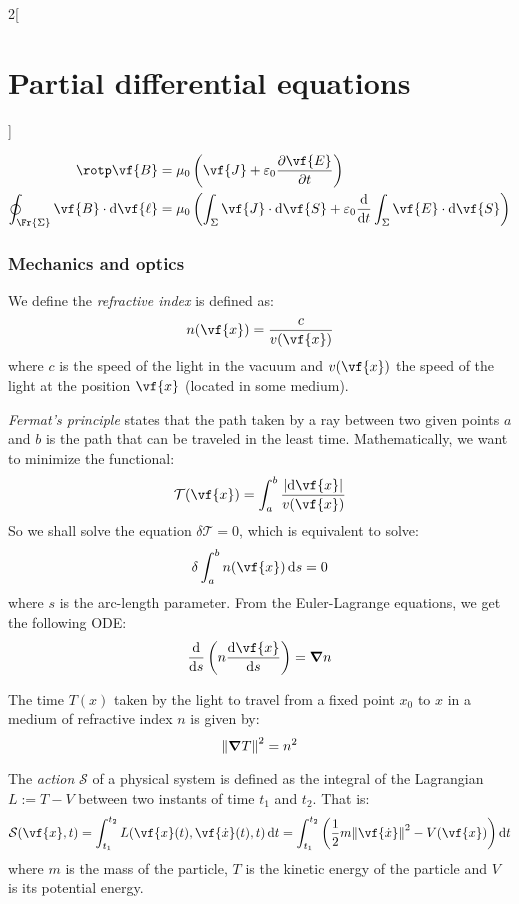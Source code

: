\documentclass[../../../main_math.tex]{subfiles}
\begin{document}
\begin{multicols}{2}[\section{Partial differential equations}]
\begin{proposition}
    \begin{align*}
      \rotp\vf{B}                                   & =\mu_0\left(\vf{J}+\varepsilon_0\pdv{\vf{E}}{t}\right)                                                        \\
      \oint_{\Fr{\Sigma}}\vf{B}\cdot \dd{\vf{\ell}} & =\mu_0 \left(\int_\Sigma\vf{J}\cdot\dd{\vf{S}}+\varepsilon_0\dv{}{t}\int_\Sigma\vf{E}\cdot \dd{\vf{S}}\right)
    \end{align*}
  \end{proposition}
  \subsubsection{Mechanics and optics}
  \begin{definition}
    We define the \emph{refractive index} is defined as: $$n(\vf{x})=\frac{c}{v(\vf{x})}$$ where $c$ is the speed of the light in the vacuum and $v(\vf{x})$ the speed of the light at the position $\vf{x}$ (located in some medium).
  \end{definition}
  \begin{proposition}
    \emph{Fermat's principle} states that the path taken by a ray between two given points $a$ and $b$ is the path that can be traveled in the least time. Mathematically, we want to minimize the functional: $$\mathcal{T}(\vf{x})=\int_a^b\frac{\abs{\dd{\vf{x}}}}{v(\vf{x})}$$
    So we shall solve the equation $\delta \mathcal{T}=0$, which is equivalent to solve: $$\delta\int_a^bn(\vf{x})\dd{s}=0$$ where $s$ is the arc-length parameter. From the Euler-Lagrange equations, we get the following ODE: $$\dv{}{s}\left(n\dv{\vf{x}}{s}\right)=\grad{n}$$
  \end{proposition}
  \begin{proposition}
    The time $T(x)$ taken by the light to travel from a fixed point $x_0$ to $x$ in a medium of refractive index $n$ is given by: $${\norm{\grad{T}}}^2=n^2$$
  \end{proposition}
  \begin{definition}
    The \emph{action} $\mathcal{S}$ of a physical system is defined as the integral of the Lagrangian $L:=T-V$ between two instants of time $t_1$ and $t_2$. That is: $$\mathcal{S}(\vf{x},t)=\int_{t_1}^{t_2}L(\vf{x}(t),\vf{\dot{x}}(t),t)\dd{t}=\int_{t_1}^{t_2}\left(\frac{1}{2}m{\norm{\vf{\dot{x}}}}^2-V(\vf{x})\right)\dd{t}$$
    where $m$ is the mass of the particle, $T$ is the kinetic energy of the particle and $V$ is its potential energy.
  \end{definition}

\end{multicols}
\end{document}
